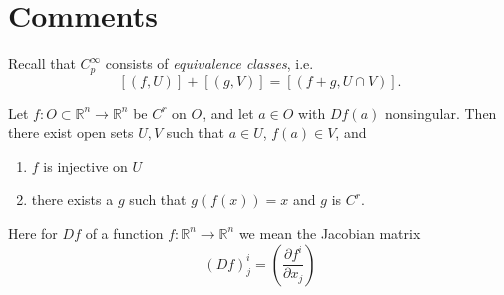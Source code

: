 \section{Comments}
Recall that $C_p^\infty$ consists of \emph{equivalence classes}, i.e.
$$
[(f, U)] + [(g, V)] = [(f + g, U \cap V)].
$$

\begin{theorem}
Let $f : O \subset \mathbb{R}^n \to \mathbb{R}^n$ be $C^r$ on $O$, and
let $a \in O$ with $Df(a)$ nonsingular. Then there exist open sets $U,
V$ such that $a \in U$, $f(a) \in V$, and
\begin{enumerate}
  \item{
    $f$ is injective on $U$
  }
  \item{
    there exists a $g$ such that $g(f(x)) = x$ and $g$ is $C^r$.
  }
\end{enumerate}
Here for $D f$ of a function $f: \mathbb{R}^n \to \mathbb{R}^n$ we
mean the Jacobian matrix
$$
  (Df)^i_j
= \left(
    \frac{\partial f^i}
         {\partial x_j}
  \right)
$$
\end{theorem}

